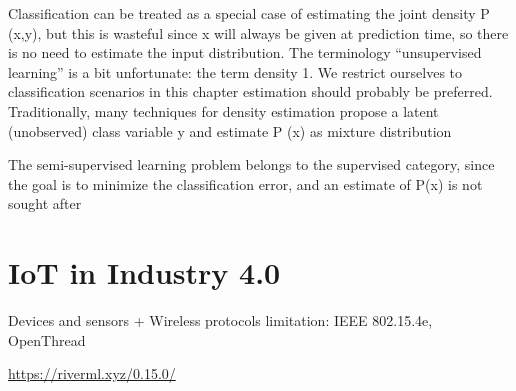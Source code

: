 Classification can be treated as a special case of estimating the joint density P (x,y), but this is wasteful since x will always be given at prediction time, so there is no need to estimate the input distribution. The terminology “unsupervised learning” is a bit unfortunate: the term density 1. We restrict ourselves to classification scenarios in this chapter estimation should probably be preferred. Traditionally, many techniques for density estimation propose a latent (unobserved) class variable y and estimate P (x) as mixture distribution

The semi-supervised learning problem belongs to the supervised category, since the goal is to minimize the classification error, and an estimate of P(x) is not sought after

\section{IoT in Industry 4.0}
	Devices and sensors + Wireless protocols limitation: IEEE 802.15.4e, OpenThread \cite{torres_automatic_2022}
	
\url{https://riverml.xyz/0.15.0/}